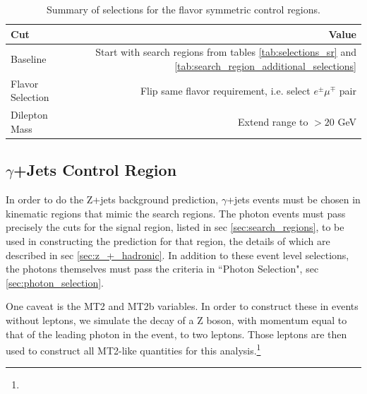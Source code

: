       \begin{table}[htb]
      \begin{center}
        \caption{\label{tab:flavor_symmetric_control_regions} 
          Summary of selections for the flavor symmetric control regions.
        }
        \begin{tabular}{l|r}\hline
        Cut & Value \\
        \hline 
        \hline
        Baseline                      & Start with search regions from tables \ref{tab:selections_sr} and \ref{tab:search_region_additional_selections}  \\
        Flavor Selection              & Flip same flavor requirement, i.e. select $e^\pm\mu^\mp$ pair \\
        Dilepton Mass                 & Extend range to $>20$ GeV \\
        \hline
        \hline
        \end{tabular}
      \end{center}
    \end{table} 

    \subsection{$\gamma$+Jets Control Region} \label{sec:met_templates_control_region}

      In order to do the Z+jets background prediction, $\gamma$+jets events must be chosen in kinematic regions that mimic the search regions. The photon events must pass precisely the cuts for the signal region, listed in sec \ref{sec:search_regions}, to be used in constructing the prediction for that region, the details of which are described in sec \ref{sec:z_+_hadronic}. In addition to these event level selections, the photons themselves must pass the criteria in ``Photon Selection", sec \ref{sec:photon_selection}.

      One caveat is the MT2 and MT2b variables. In order to construct these in events without leptons, we simulate the decay of a Z boson, with momentum equal to that of the leading photon in the event, to two leptons. Those leptons are then used to construct all MT2-like quantities for this analysis.\footnote{}

